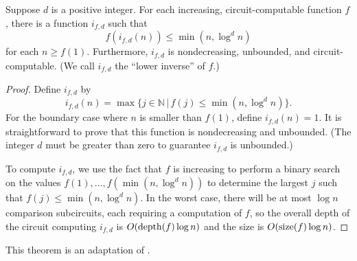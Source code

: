 \begin{lemma}\label{lem:lowerinverse}
  Suppose $d$ is a positive integer.
  For each increasing, circuit-computable function $f$, there is a function $i_{f, d}$ such that
  \[
  f(i_{f, d}(n)) \leq \min(n, \log^d n)
  \]
  for each $n \geq f(1)$.
  Furthermore, $i_{f, d}$ is nondecreasing, unbounded, and circuit-computable.
  (We call $i_{f, d}$ the ``lower inverse'' of $f$.)
\end{lemma}
\begin{proof}
  Define $i_{f, d}$ by
  \[
  i_{f, d}(n) = \max\{ j \in \mathbb{N} \, | \, f(j) \leq \min(n, \log^d n) \}.
  \]
  For the boundary case where $n$ is smaller than $f(1)$, define $i_{f, d}(n) = 1$.
  It is straightforward to prove that this function is nondecreasing and unbounded.
  (The integer $d$ must be greater than zero to guarantee $i_{f, d}$ is unbounded.)

  To compute $i_{f, d}$, we use the fact that $f$ is increasing to perform a binary search on the values $f(1), \dotsc, f(\min(n, \log^d n))$ to determine the largest $j$ such that $f(j) \leq \min(n, \log^d n)$.
  In the worst case, there will be at most $\log n$ comparison subcircuits, each requiring a computation of $f$, so the overall depth of the circuit computing $i_{f, d}$ is $O(\operatorname{depth}(f) \log n)$ and the size is $O(\operatorname{size}(f) \log n)$.
\end{proof}

This theorem is an adaptation of \autocite[Theorem~3.29]{fg06}.


